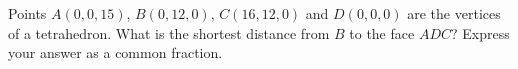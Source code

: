 Points $A(0,0,15)$, $B(0,12,0)$, $C(16,12,0)$ and $D(0,0,0)$ are the vertices of a tetrahedron. What is the shortest distance from $B$ to the face $ADC$? Express your answer as a common fraction.
